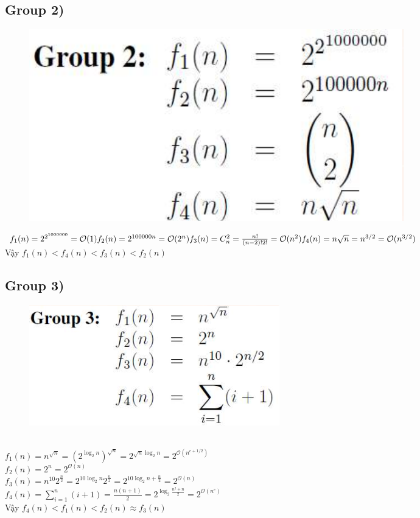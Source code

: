 \documentclass[10pt,a4paper]{article}
\begin{document}
\subsection*{Group 2)}
\begin{figure}[H]
    \centering
    \includegraphics[scale=.8]{images/4.2.png}
\end{figure}
$f_1(n) = 2^{2^{1000000}} = \mathcal{O}(1)\\
f_2(n) = 2^{100000n} = \mathcal{O}(2^n)\\
f_3(n) = C_n^2 =\frac{n!}{(n-2)!2!} = \mathcal{O}(n^2)\\
f_4(n) = n\sqrt{n} = n^{3/2} = \mathcal{O}(n^{3/2})$\\
Vậy $f_1(n) < f_4(n) < f_3(n) < f_2(n)$
\subsection*{Group 3)}
\begin{figure}[H]
    \centering
    \includegraphics[scale=1]{images/4g3.png}
\end{figure}
\\
$f_1(n) = n^{\sqrt{n}} = (2^{\log_2{n}})^{\sqrt{n}} = 2^{\sqrt{n}\log_2{n}} = 2^{\mathcal{O}(n^{c+1/2})}$  \\
$f_2(n) = 2^n = 2^{\mathcal{O}(n)}$ \\
$f_3(n) = {n^{10}}{2^{\frac{n}{2}}} = {2^{10{\log_2{n}}}}{2^{\frac{n}{2}}} = 
2^{10{\log_2{n}} + \frac{n}{2}} = 2^{\mathcal{O}(n)}$\\
$f_4(n) = \sum_{i=1}^{n}(i+1) = \frac{n(n+1)}{2} = 2^{\log_2{\frac{n^2+n}{2}}} = 2^{\mathcal{O}(n^c)}$  \\
Vậy $f_4(n) < f_1(n) < f_2(n) \approx f_3(n)$
\end{document}
